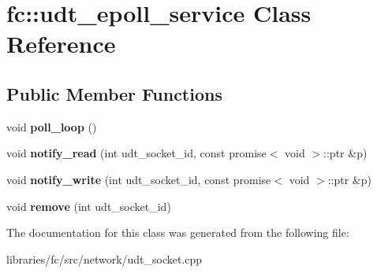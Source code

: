 \hypertarget{classfc_1_1udt__epoll__service}{}\section{fc\+:\+:udt\+\_\+epoll\+\_\+service Class Reference}
\label{classfc_1_1udt__epoll__service}
\subsection*{Public Member Functions}
\begin{DoxyCompactItemize}
\item 
\mbox{\label{classfc_1_1udt__epoll__service_a134ece4113edfdae09280cddd1e74620}} 
void {\bfseries poll\+\_\+loop} ()
\item 
\mbox{\label{classfc_1_1udt__epoll__service_ab596b07529bbe31b918003d0a6b86c19}} 
void {\bfseries notify\+\_\+read} (int udt\+\_\+socket\+\_\+id, const promise$<$ void $>$\+::ptr \&p)
\item 
\mbox{\label{classfc_1_1udt__epoll__service_af496434c4aded526255625c4b3ed5b25}} 
void {\bfseries notify\+\_\+write} (int udt\+\_\+socket\+\_\+id, const promise$<$ void $>$\+::ptr \&p)
\item 
\mbox{\label{classfc_1_1udt__epoll__service_ade4245e6e1ba5bd523ab82b100b8c3f0}} 
void {\bfseries remove} (int udt\+\_\+socket\+\_\+id)
\end{DoxyCompactItemize}


The documentation for this class was generated from the following file\+:\begin{DoxyCompactItemize}
\item 
libraries/fc/src/network/udt\+\_\+socket.\+cpp\end{DoxyCompactItemize}
